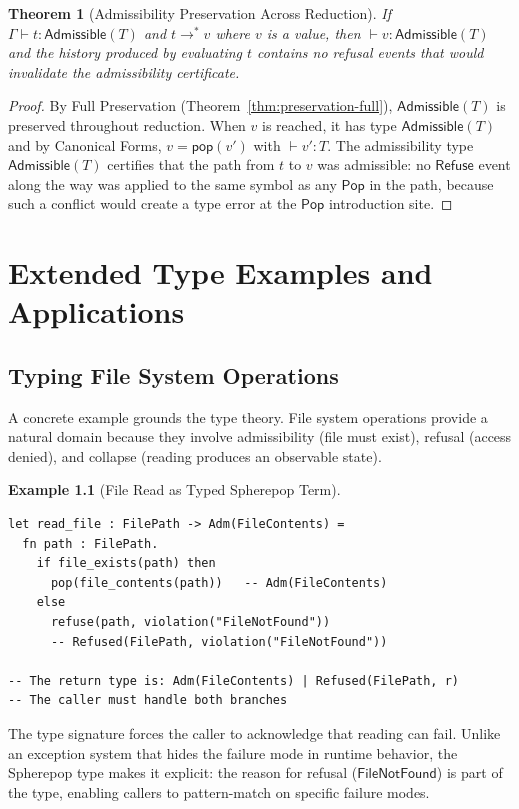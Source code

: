 \documentclass[12pt, a4paper, openany]{book}
\theoremstyle{plain}
\newtheorem{theorem}{Theorem}[chapter]
\theoremstyle{definition}
\newtheorem{example}[theorem]{Example}
\theoremstyle{remark}
\newcommand{\Pop}{\mathsf{Pop}}
\newcommand{\Refuse}{\mathsf{Refuse}}
\newcommand{\Adm}{\mathsf{Admissible}}
\begin{document}
\begin{theorem}[Admissibility Preservation Across Reduction]
If $\Gamma \vdash t : \Adm(T)$ and $t \to^* v$ where $v$ is a value, then
$\vdash v : \Adm(T)$ and the history produced by evaluating $t$ contains no
refusal events that would invalidate the admissibility certificate.
\end{theorem}

\begin{proof}
By Full Preservation (Theorem~\ref{thm:preservation-full}), $\Adm(T)$ is
preserved throughout reduction. When $v$ is reached, it has type $\Adm(T)$
and by Canonical Forms, $v = \mathsf{pop}(v')$ with $\vdash v' : T$. The
admissibility type $\Adm(T)$ certifies that the path from $t$ to $v$ was
admissible: no $\Refuse$ event along the way was applied to the same symbol
as any $\Pop$ in the path, because such a conflict would create a type error
at the $\Pop$ introduction site.
\end{proof}

\chapter{Extended Type Examples and Applications}

\section{Typing File System Operations}

A concrete example grounds the type theory. File system operations provide a
natural domain because they involve admissibility (file must exist), refusal
(access denied), and collapse (reading produces an observable state).

\begin{example}[File Read as Typed Spherepop Term]
\begin{lstlisting}[style=rust, caption={File read in typed Spherepop}]
let read_file : FilePath -> Adm(FileContents) =
  fn path : FilePath.
    if file_exists(path) then
      pop(file_contents(path))   -- Adm(FileContents)
    else
      refuse(path, violation("FileNotFound"))
      -- Refused(FilePath, violation("FileNotFound"))

-- The return type is: Adm(FileContents) | Refused(FilePath, r)
-- The caller must handle both branches
\end{lstlisting}
The type signature forces the caller to acknowledge that reading can fail.
Unlike an exception system that hides the failure mode in runtime behavior,
the Spherepop type makes it explicit: the reason for refusal ($\mathsf{FileNotFound}$)
is part of the type, enabling callers to pattern-match on specific failure modes.
\end{example}
\end{document}
